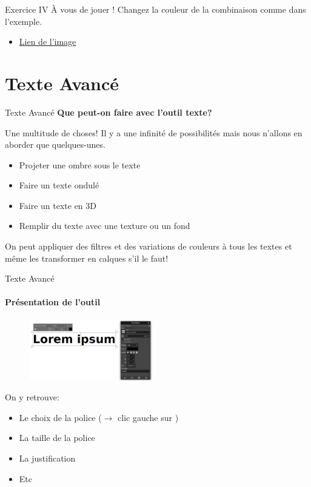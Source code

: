 \documentclass[10pt,svgnames,usenames,table]{beamer}
\newlength\myheight
\newlength\mydepth
\newcommand*\inlinegraphics[1]{%
  \settototalheight\myheight{Xygp}%
  \settodepth\mydepth{Xygp}%
  \raisebox{-\mydepth}{\texttt{[image: \#1]}}%
}
\begin{document}
	\begin{frame}{Exercice IV}
		À vous de jouer ! Changez la couleur de la combinaison comme dans l'exemple.
		\begin{itemize}
			\item \href{http://louvainlinux.github.io/atelier-gimp/src/Images/colours/col5.jpg}{Lien de l'image}
		\end{itemize}
	\end{frame}




\section{Texte Avancé}
	\begin{frame}{Texte Avancé}
		\textbf{Que peut-on faire avec l'outil texte?}		

		Une multitude de choses! Il y a une infinité de possibilités mais nous n'allons en aborder que quelques-unes.
		\begin{itemize}
			\item Projeter une ombre sous le texte
			\item Faire un texte ondulé
			\item Faire un texte en 3D
			\item Remplir du texte avec une texture ou un fond
		\end{itemize}
		
		On peut appliquer des filtres et des variations de couleurs à tous les textes et même les transformer en calques s'il le faut!
	\end{frame}

\begin{frame}{Texte Avancé}
	\framesubtitle{Présentation de l'outil}
	\begin{figure}
		\centering
		\includegraphics[height=100px]{Images/text/text}
	\end{figure}
	On y retrouve:
	\begin{itemize}
	\item Le choix de la police ($\rightarrow$ clic gauche sur  \inlinegraphics{Images/text/font} )
	\item La taille de la police
	\item La justification
	\item Etc
	\end{itemize}
\end{frame}
\end{document}

